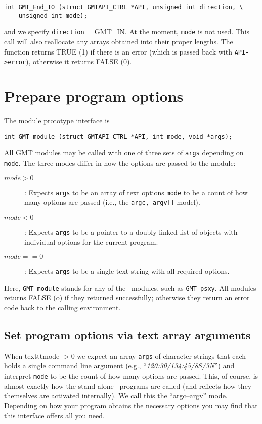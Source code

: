 \documentclass[11pt]{report}
\begin{document}
\begin{verbatim}
int GMT_End_IO (struct GMTAPI_CTRL *API, unsigned int direction, \
    unsigned int mode);
\end{verbatim}

\noindent
and we specify \texttt{direction} = GMT\_IN.  At the moment, \texttt{mode} is not used.  This call
will also reallocate any arrays obtained into their proper lengths.
The function returns TRUE (1) if there is an error (which is passed back with \texttt{API->error}),
otherwise it returns FALSE (0).

\section{Prepare program options}
\label{sec:func}
The module prototype interface is

\begin{verbatim}
int GMT_module (struct GMTAPI_CTRL *API, int mode, void *args);
\end{verbatim}
All GMT modules may be called with one of three sets of \texttt{args} depending on \texttt{mode}.
The three modes differ in how the options are passed to the module:
\begin{description}
\item [$mode > 0$]: Expects \texttt{args} to be an array of text options \texttt{mode} to be a count of
how many options are passed (i.e., the \texttt{argc, argv[]} model).
\item [$mode < 0$]: Expects \texttt{args} to be a pointer to a doubly-linked list of objects with individual options
for the current program.
\item [$mode == 0$]: Expects \texttt{args} to be a single text string with all required options.
\end{description}
Here, \texttt{GMT\_module} stands for any of the \GMT\ modules, such as \texttt{GMT\_psxy}.
All modules returns FALSE (o) if they returned successfully; otherwise they return an error code
back to the calling environment.

\subsection{Set program options via text array arguments}

When texttt{mode} $> 0$ we expect an array \texttt{args} of character strings that each
holds a single command line argument (e.g., ``\Opt{R}\emph{120:30/134:45/8S/3N}'') and interpret \texttt{mode}
to be the count of how many options are passed.  This, of course, is almost exactly how the stand-alone \GMT\
programs are called (and reflects how they themselves are activated internally).  We call this the ``argc--argv'' mode.
Depending on how your program obtains the necessary options you may find that this interface offers all you need.
\end{document}

